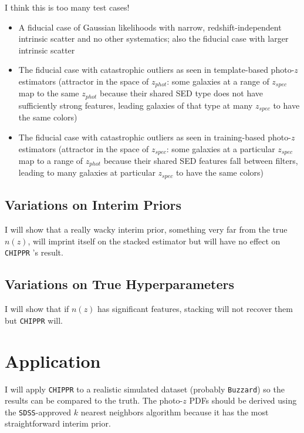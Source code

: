 \documentclass[preprint]{aastex}
\newcommand{\chippr}{\texttt{CHIPPR} }
\begin{document}
I think this is too many test cases!

\begin{itemize}
	\item A fiducial case of Gaussian likelihoods with narrow, 
redshift-independent intrinsic scatter and no other systematics; also the 
fiducial case with larger intrinsic scatter
	\item The fiducial case with catastrophic outliers as seen in 
template-based photo-$z$ estimators (attractor in the space of $z_{phot}$: some 
galaxies at a range of $z_{spec}$ map to the same $z_{phot}$ because their 
shared SED type does not have sufficiently strong features, leading galaxies of 
that type at many $z_{spec}$ to have the same colors)
	\item The fiducial case with catastrophic outliers as seen in 
training-based photo-$z$ estimators (attractor in the space of $z_{spec}$: some 
galaxies at a particular $z_{spec}$ map to a range of $z_{phot}$ because their 
shared SED features fall between filters, leading to many galaxies at 
particular $z_{spec}$ to have the same colors)
\end{itemize}

\subsection{Variations on Interim Priors}
\label{sec:priors}

I will show that a really wacky interim prior, something very far from the true 
$n(z)$, will imprint itself on the stacked estimator but will have no effect on 
\chippr's result.

\subsection{Variations on True Hyperparameters}
\label{sec:truth}

I will show that if $n(z)$ has significant features, stacking will not recover 
them but \chippr will.

\section{Application}
\label{sec:application}

I will apply \chippr to a realistic simulated dataset (probably 
\texttt{Buzzard}) so the results can be compared to the truth.  The photo-$z$ 
PDFs should be derived using the \texttt{SDSS}-approved $k$ nearest neighbors 
algorithm because it has the most straightforward interim prior.
\end{document}
